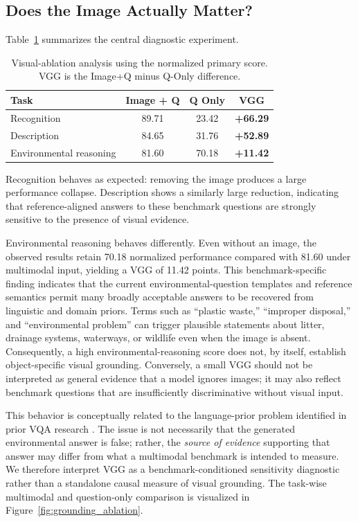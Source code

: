 \documentclass{article}
\begin{document}
\subsection{Does the Image Actually Matter?}
\label{subsec:image_ablation_results}
Table~\ref{tab:visual_ablation} summarizes the central diagnostic experiment.
\begin{table}[t]
\centering
\caption{Visual-ablation analysis using the normalized primary score. VGG is the Image+Q minus Q-Only difference.}
\label{tab:visual_ablation}
\begin{tabular}{lccc}
\toprule
\textbf{Task}
&
\textbf{Image + Q}
&
\textbf{Q Only}
&
\textbf{VGG} \\
\midrule
Recognition
& 89.71
& 23.42
& \textbf{+66.29} \\

Description
& 84.65
& 31.76
& \textbf{+52.89} \\

Environmental reasoning
& 81.60
& 70.18
& \textbf{+11.42} \\
\bottomrule
\end{tabular}
\end{table}
Recognition behaves as expected: removing the image produces a large performance collapse. Description shows a similarly large reduction, indicating that reference-aligned answers to these benchmark questions are strongly sensitive to the presence of visual evidence.

Environmental reasoning behaves differently. Even without an image, the observed results retain 70.18 normalized performance compared with 81.60 under multimodal input, yielding a VGG of 11.42 points. This benchmark-specific finding indicates that the current environmental-question templates and reference semantics permit many broadly acceptable answers to be recovered from linguistic and domain priors. Terms such as ``plastic waste,'' ``improper disposal,'' and ``environmental problem'' can trigger plausible statements about litter, drainage systems, waterways, or wildlife even when the image is absent. Consequently, a high environmental-reasoning score does not, by itself, establish object-specific visual grounding. Conversely, a small VGG should not be interpreted as general evidence that a model ignores images; it may also reflect benchmark questions that are insufficiently discriminative without visual input.

This behavior is conceptually related to the language-prior problem identified in prior VQA research \citep{goyal2017makingv}. The issue is not necessarily that the generated environmental answer is false; rather, the \emph{source of evidence} supporting that answer may differ from what a multimodal benchmark is intended to measure. We therefore interpret VGG as a benchmark-conditioned sensitivity diagnostic rather than a standalone causal measure of visual grounding. The task-wise multimodal and question-only comparison is visualized in Figure~\ref{fig:grounding_ablation}.
\end{document}
